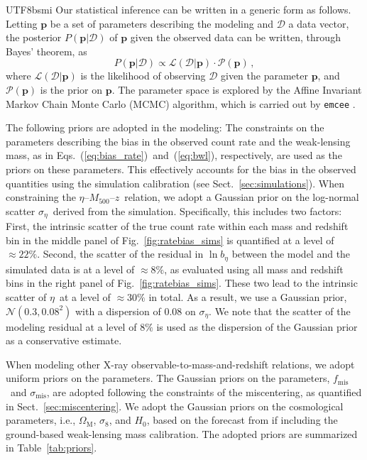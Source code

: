 \documentclass[longauth]{aa}
\newcommand{\OmegaM}{\ensuremath{\Omega_{\mathrm{M}}}}
\newcommand{\Hnow}{\ensuremath{H_{0}}}
\newcommand{\sigmaeight}{\ensuremath{\sigma_{8}}}
\newcommand{\Mfiveoo}{\ensuremath{M_{500}}}
\newcommand{\redshift}{\ensuremath{z}}
\newcommand{\fmis}{\ensuremath{f_{\mathrm{mis}}}}
\newcommand{\sigmamis}{\ensuremath{{\sigma}_{\mathrm{mis}}}}
\newcommand{\rate}{\ensuremath{\eta}}
\newcommand{\brate}{\ensuremath{b_{\eta}}}
\newcommand{\sigmaeta}{\ensuremath{\sigma_{\eta}}}
\newcommand{\percent}{\ensuremath{\%}}
\begin{document}
\begin{CJK*}{UTF8}{bsmi}
Our statistical inference can be written in a generic form as follows.
Letting $\mathbf{p}$ be a set of parameters describing the modeling and $\mathcal{D}$  a data vector, the posterior $P(\mathbf{p} | \mathcal{D})$ of $\mathbf{p}$ given the observed data can be written, through Bayes' theorem, as
%
\begin{equation}
\label{eq:posterior}
P(\mathbf{p} | \mathcal{D}) \propto \mathcal{L}(\mathcal{D}| \mathbf{p}) \cdot\mathcal{P(\mathbf{p})} \, ,
\end{equation}
%
where $\mathcal{L}(\mathcal{D}| \mathbf{p})$ is the likelihood of observing $\mathcal{D}$ given the parameter $\mathbf{p}$, and $\mathcal{P(\mathbf{p})}$ is the prior on $\mathbf{p}$.
The parameter space is explored by the Affine Invariant Markov Chain Monte Carlo (MCMC) algorithm, which is carried out by \texttt{emcee} \citep{foreman13,foreman19}.

The following priors are adopted in the modeling:
The constraints on the parameters describing the bias in the observed count rate and the weak-lensing mass, as in Eqs.~(\ref{eq:bias_rate})~and~(\ref{eq:bwl}), respectively, are used as the priors on these parameters.
This effectively accounts for the bias in the observed quantities using the simulation calibration (see Sect.~\ref{sec:simulations}).
When constraining the \rate--\Mfiveoo--\redshift\ relation, we adopt a Gaussian prior on the log-normal scatter \sigmaeta\ derived from the simulation.
Specifically, this includes two factors: 
First, the intrinsic scatter of the true count rate within each mass and redshift bin in the middle panel of Fig.~\ref{fig:ratebias_sims} is quantified at a level of $\approx22\percent$.
Second, the scatter of the residual in $\ln\brate$ between the model and the simulated data is at a level of $\approx8\percent$, as evaluated using all mass and redshift bins in the right panel of Fig.~\ref{fig:ratebias_sims}.
These two lead to the intrinsic scatter of \rate\ at a level of $\approx30\percent$ in total.
As a result, we use a Gaussian prior, $\mathcal{N}(0.3, 0.08^2)$ with a dispersion of $0.08$ on \sigmaeta.
We note that the scatter of the modeling residual at a level of $8\percent$ is used as the dispersion of the Gaussian prior as a conservative estimate.

When modeling other X-ray observable-to-mass-and-redshift relations, we adopt uniform priors on the parameters. 
The Gaussian priors on the parameters, \fmis\ and \sigmamis, are adopted following the constraints of the miscentering, as quantified in Sect.~\ref{sec:miscentering}.
We adopt the Gaussian priors on the cosmological parameters, i.e., \OmegaM, \sigmaeight, and \Hnow, based on the forecast from \cite{grandis19} if including the ground-based weak-lensing mass calibration.
The adopted priors are summarized in Table~\ref{tab:priors}.







\end{CJK*}
\end{document}
